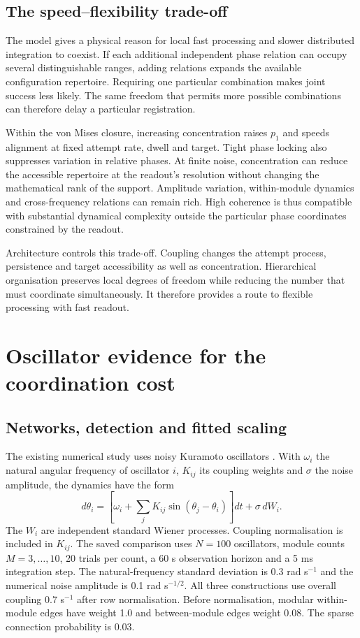 \documentclass[11pt]{article}
\begin{document}
\subsection{The speed--flexibility trade-off}

The model gives a physical reason for local fast processing and slower
distributed integration to coexist. If each additional independent
phase relation can occupy several distinguishable ranges, adding
relations expands the available configuration repertoire. Requiring
one particular combination makes joint success less likely. The same
freedom that permits more possible combinations can therefore delay
a particular registration.

Within the von Mises closure, increasing concentration raises
$p_1$ and speeds alignment at fixed attempt rate, dwell and target.
Tight phase locking also suppresses variation in relative phases.
At finite noise, concentration can reduce the accessible repertoire
at the readout's resolution without changing the mathematical rank
of the support. Amplitude variation, within-module dynamics and
cross-frequency relations can remain rich. High coherence is thus
compatible with substantial dynamical complexity outside the
particular phase coordinates constrained by the readout.

Architecture controls this trade-off. Coupling changes the attempt
process, persistence and target accessibility as well as concentration.
Hierarchical organisation preserves local degrees of freedom while
reducing the number that must coordinate simultaneously. It therefore
provides a route to flexible processing with fast readout.

\section{Oscillator evidence for the coordination cost}
\subsection{Networks, detection and fitted scaling}

The existing numerical study uses noisy Kuramoto oscillators
\cite{kuramoto1984,acebron2005}. With $\omega_i$ the natural angular
frequency of oscillator $i$, $K_{ij}$ its coupling weights and
$\sigma$ the noise amplitude, the dynamics have the form
\begin{equation}
 d\theta_i=\left[\omega_i+
       \sum_j K_{ij}\sin(\theta_j-\theta_i)\right]dt
       +\sigma\,dW_i .
 \label{eq:kuramoto}
\end{equation}
The $W_i$ are independent standard Wiener processes. Coupling
normalisation is included in $K_{ij}$. The saved comparison uses
$N=100$ oscillators, module counts $M=3,\ldots,10$, 20 trials per
count, a 60 s observation horizon and a 5 ms integration step.
The natural-frequency standard deviation is 0.3 rad s$^{-1}$ and
the numerical noise amplitude is 0.1 rad s$^{-1/2}$.
All three constructions use overall coupling 0.7 s$^{-1}$ after
row normalisation. Before normalisation, modular within-module
edges have weight 1.0 and between-module edges weight 0.08.
The sparse connection probability is 0.03.
\end{document}
